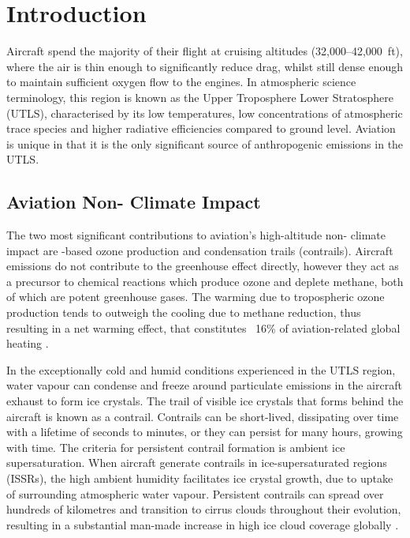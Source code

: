 \section{Introduction}
\label{Intro}

Aircraft spend the majority of their flight at cruising altitudes (32,000--42,000~ft), where the air is thin enough to significantly reduce drag, whilst still dense enough to maintain sufficient oxygen flow to the engines. In atmospheric science terminology, this region is known as the Upper Troposphere Lower Stratosphere (UTLS), characterised by its low temperatures, low concentrations of atmospheric trace species and higher radiative efficiencies compared to ground level. Aviation is unique in that it is the only significant source of anthropogenic emissions in the UTLS.

\subsection{Aviation Non-\texorpdfstring{}{CO2} Climate Impact}
The two most significant contributions to aviation's high-altitude non- climate impact are -based ozone production and condensation trails (contrails). Aircraft  emissions do not contribute to the greenhouse effect directly, however they act as a precursor to chemical reactions which produce ozone and deplete methane, both of which are potent greenhouse gases. The warming due to tropospheric ozone production tends to outweigh the cooling due to methane reduction, thus resulting in a net warming effect, that constitutes ~16\% of aviation-related global heating \cite{Lee2021}.

In the exceptionally cold and humid conditions experienced in the UTLS region, water vapour can condense and freeze around particulate emissions in the aircraft exhaust to form ice crystals. The trail of visible ice crystals that forms behind the aircraft is known as a contrail. Contrails can be short-lived, dissipating over time with a lifetime of seconds to minutes, or they can persist for many hours, growing with time. The criteria for persistent contrail formation is ambient ice supersaturation. When aircraft generate contrails in ice-supersaturated regions (ISSRs), the high ambient humidity facilitates ice crystal growth, due to uptake of surrounding atmospheric water vapour. Persistent contrails can spread over hundreds of kilometres and transition to cirrus clouds throughout their evolution, resulting in a substantial man-made increase in high ice cloud coverage globally \cite{Karcher2018, Schumann2017}.

